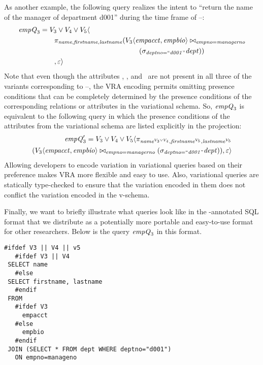 As another example, the following query realizes the intent to ``return the
name of the manager of department d001'' during the time frame of
\vThree--\vFive:
%
\begin{align*}
\eq_3 &= \vThree\vee\vFour\vee\vFive \langle\\
&\qquad  \pi_{\name,\fname,\lname} 
({\chc[\vThree]{\empacct,\empbio}}
          \bowtie_{\empno=\managerno}\\
&\qquad \qquad \qquad \qquad \qquad \qquad \qquad {(\vSel[\deptno=\deptOne]{\dept})}
)\\
&\qquad           ,
  \empRel \rangle
\end{align*}
%
\noindent
Note that even though the attributes \name, \fname, and \lname\ are not present
in all three of the variants corresponding to \vThree--\vFive, the VRA encoding
permits omitting presence conditions that can be completely determined by the
presence conditions of the corresponding relations or attributes in the
variational schema. So, $\eq_3$ is equivalent to the following query in which the
presence conditions of the attributes from the variational schema are listed
explicitly in the projection:
%
\begin{align*}
\VVal {\eq_3} = \vThree\vee\vFour\vee\vFive \langle
  \pi_{\oatt{\name}{\vThree\vee\vFour},\oatt{\fname}{\vFive},\oatt{\lname}{\vFive}} 
  \\
  (\joinRel{\chc[\vThree]{\empacct,\empbio}}{(\vSel[\deptno=\deptOne]{\dept})}
           {\empno=\managerno}),
  \empRel \rangle
\end{align*}
%
%
 \noindent
Allowing developers to encode variation in variational queries based on their
preference makes VRA more flexible and easy to use. 
Also, variational queries are statically type-checked to ensure that
the variation encoded in them does not conflict the variation encoded
in the v-schema. 

 Finally, we want to briefly illustrate what queries look like in the
 -annotated SQL format that we distribute as a potentially more
 portable and easy-to-use format for other researchers. Below is the query $\eq_3$
 in this format.

 \begin{lstlisting}[basicstyle=\footnotesize\ttfamily,columns=flexible,lineskip=0.5\baselineskip]
 #ifdef V3 || V4 || v5
   #ifdef V3 || V4
 SELECT name
   #else
 SELECT firstname, lastname
   #endif
 FROM
   #ifdef V3
     empacct
   #else
     empbio
   #endif
 JOIN (SELECT * FROM dept WHERE deptno="d001")
   ON empno=manageno  
 \end{lstlisting}


%
